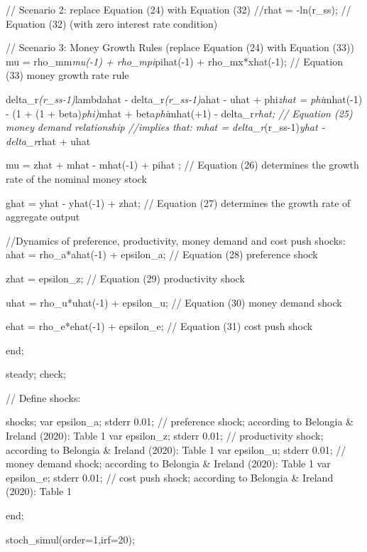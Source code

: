 \documentclass[11pt,preprint, authoryear]{elsarticle}
\numberwithin{equation}{section}
\numberwithin{figure}{section}
\numberwithin{table}{section}
\begin{document}
// Scenario 2: replace Equation (24) with Equation (32) //rhat =
-ln(r\_ss); // Equation (32) (with zero interest rate condition)

// Scenario 3: Money Growth Rules (replace Equation (24) with Equation
(33)) mu = rho\_mm\emph{mu(-1) + rho\_mpi}pihat(-1) + rho\_mx*xhat(-1);
// Equation (33) money growth rate rule

delta\_r\emph{(r\_ss-1)}lambdahat - delta\_r\emph{(r\_ss-1)}ahat - uhat
+ phi\emph{zhat = phi}mhat(-1) - (1 + (1 + beta)\emph{phi)}mhat +
beta\emph{phi}mhat(+1) - delta\_r\emph{rhat; // Equation (25) money
demand relationship //implies that: mhat = delta\_r}(r\_ss-1)\emph{yhat
- delta\_r}rhat + uhat

mu = zhat + mhat - mhat(-1) + pihat ; // Equation (26) determines the
growth rate of the nominal money stock

ghat = yhat - yhat(-1) + zhat; // Equation (27) determines the growth
rate of aggregate output

//Dynamics of preference, productivity, money demand and cost push
shocks: ahat = rho\_a*ahat(-1) + epsilon\_a; // Equation (28) preference
shock

zhat = epsilon\_z; // Equation (29) productivity shock

uhat = rho\_u*uhat(-1) + epsilon\_u; // Equation (30) money demand shock

ehat = rho\_e*ehat(-1) + epsilon\_e; // Equation (31) cost push shock

end;

steady; check;

// Define shocks:

shocks; var epsilon\_a; stderr 0.01; // preference shock; according to
Belongia \& Ireland (2020): Table 1 var epsilon\_z; stderr 0.01; //
productivity shock; according to Belongia \& Ireland (2020): Table 1 var
epsilon\_u; stderr 0.01; // money demand shock; according to Belongia \&
Ireland (2020): Table 1 var epsilon\_e; stderr 0.01; // cost push shock;
according to Belongia \& Ireland (2020): Table 1

end;

stoch\_simul(order=1,irf=20);


\end{document}
